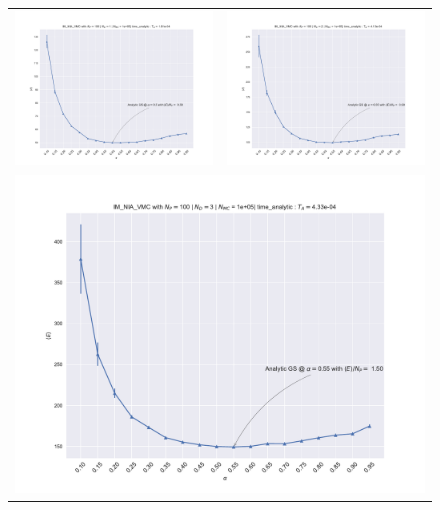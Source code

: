 \begin{figure}
\hspace{-2.8cm}
\begin{tabular}{cc}
\includegraphics[width = 0.5\paperwidth]{figures/c_figs/IM_NIA_np_100_nd_1.pdf} & \includegraphics[width = 0.5\paperwidth]{figures/c_figs/IM_NIA_np_100_nd_2.pdf} \\
\multicolumn{2}{c}{\includegraphics[width=0.5\paperwidth]{figures/c_figs/IM_NIA_np_100_nd_3.pdf} }

\end{tabular}
\end{figure}
